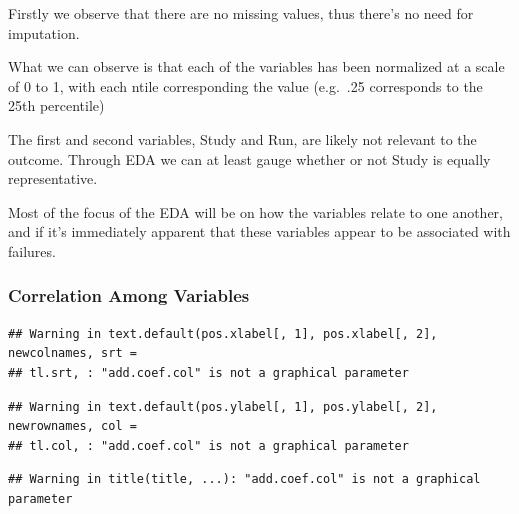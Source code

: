 \documentclass[
  11pt,
]{article}
\newenvironment{Shaded}{\begin{snugshade}}{\end{snugshade}}
\newcommand{\DataTypeTok}[1]{\textcolor[rgb]{0.13,0.29,0.53}{#1}}
\newcommand{\FloatTok}[1]{\textcolor[rgb]{0.00,0.00,0.81}{#1}}
\newcommand{\KeywordTok}[1]{\textcolor[rgb]{0.13,0.29,0.53}{\textbf{#1}}}
\newcommand{\NormalTok}[1]{#1}
\newcommand{\OperatorTok}[1]{\textcolor[rgb]{0.81,0.36,0.00}{\textbf{#1}}}
\newcommand{\StringTok}[1]{\textcolor[rgb]{0.31,0.60,0.02}{#1}}
\begin{document}
Firstly we observe that there are no missing values, thus there's no
need for imputation.

What we can observe is that each of the variables has been normalized at
a scale of 0 to 1, with each ntile corresponding the value (e.g.~.25
corresponds to the 25th percentile)

The first and second variables, Study and Run, are likely not relevant
to the outcome. Through EDA we can at least gauge whether or not Study
is equally representative.

Most of the focus of the EDA will be on how the variables relate to one
another, and if it's immediately apparent that these variables appear to
be associated with failures.

\hypertarget{correlation-among-variables}{%
\subsubsection{Correlation Among
Variables}\label{correlation-among-variables}}

\begin{Shaded}
\end{Shaded}

\begin{verbatim}
## Warning in text.default(pos.xlabel[, 1], pos.xlabel[, 2], newcolnames, srt =
## tl.srt, : "add.coef.col" is not a graphical parameter
\end{verbatim}

\begin{verbatim}
## Warning in text.default(pos.ylabel[, 1], pos.ylabel[, 2], newrownames, col =
## tl.col, : "add.coef.col" is not a graphical parameter
\end{verbatim}

\begin{verbatim}
## Warning in title(title, ...): "add.coef.col" is not a graphical parameter
\end{verbatim}
\end{document}

